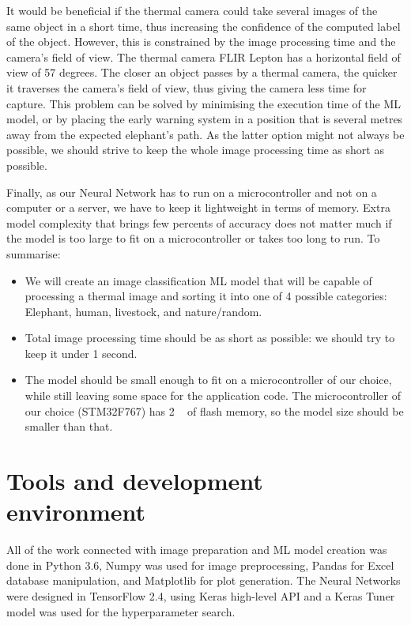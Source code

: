It would be beneficial if the thermal camera could take several images of the same object in a short time, thus increasing the confidence of the computed label of the object.
However, this is constrained by the image processing time and the camera's field of view.
The thermal camera FLIR Lepton has a horizontal field of view of 57 degrees.
The closer an object passes by a thermal camera, the quicker it traverses the camera's field of view, thus giving the camera less time for capture.
This problem can be solved by minimising the execution time of the ML model, or by placing the early warning system in a position that is several metres away from the expected elephant's path.
As the latter option might not always be possible, we should strive to keep the whole image processing time as short as possible.

Finally, as our Neural Network has to run on a microcontroller and not on a computer or a server, we have to keep it lightweight in terms of memory.
Extra model complexity that brings few percents of accuracy does not matter much if the model is too large to fit on a microcontroller or takes too long to run.
\clearpage
To summarise:

\begin{itemize}
    \item We will create an image classification ML model that will be capable of processing a thermal image and sorting it into one of 4 possible categories: Elephant, human, livestock, and nature/random.
    \item Total image processing time should be as short as possible: we should try to keep it under 1 second.
    \item The model should be small enough to fit on a microcontroller of our choice, while still leaving some space for the application code. The microcontroller of our choice (STM32F767) has 2 \si{\mega\byte} of flash memory, so the model size should be smaller than that.
\end{itemize}


\section{ Tools and development environment}

All of the work connected with image preparation and ML model creation was done in Python 3.6, Numpy was used for image preprocessing, Pandas for Excel database manipulation, and Matplotlib for plot generation.
The Neural Networks were designed in TensorFlow 2.4, using Keras high-level API and a Keras Tuner model was used for the hyperparameter search.

